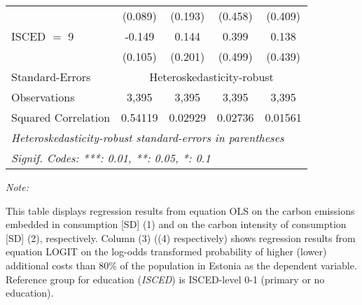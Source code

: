 \begin{table}[htbp!]
\begin{adjustbox}{width = 1\textwidth, max height = 0.95\textheight, center}
\begin{threeparttable}[b]
\begin{tabular}{lcccc}
                                 & (0.089)            & (0.193)            & (0.458)        & (0.409)\\   
            ISCED $=$ 9          & -0.149             & 0.144              & 0.399          & 0.138\\   
                                 & (0.105)            & (0.201)            & (0.499)        & (0.439)\\   
            \midrule 
            Standard-Errors & \multicolumn{4}{c}{Heteroskedasticity-robust} \\ 
            Observations         & 3,395              & 3,395              & 3,395          & 3,395\\  
            Squared Correlation  & 0.54119            & 0.02929            & 0.02736        & 0.01561\\  
            \midrule \midrule
            \multicolumn{5}{l}{\emph{Heteroskedasticity-robust standard-errors in parentheses}}\\
            \multicolumn{5}{l}{\emph{Signif. Codes: ***: 0.01, **: 0.05, *: 0.1}}\\
         \end{tabular}
         
         \begin{tablenotes}\item \medskip \textit{Note:}
            \item This table displays regression results from equation OLS on the carbon emissions embedded in consumption [SD] (1) and on the carbon intensity of consumption [SD] (2), respectively. 
                                      Column (3) ((4) respectively) shows regression results from equation LOGIT on the log-odds transformed probability of higher (lower) additional costs than 80\% of the population in Estonia as the dependent variable. Reference group for education (\textit{ISCED}) is ISCED-level 0-1 (primary or no education).
         \end{tablenotes}
      \end{threeparttable}
   \end{adjustbox}
\end{table}


